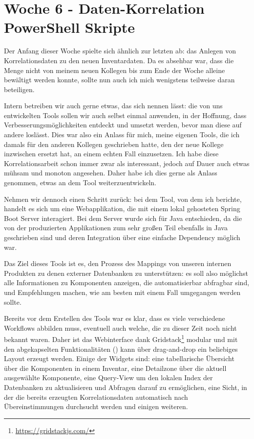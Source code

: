 \section{Woche 6 - Daten-Korrelation \headerand PowerShell Skripte} \label{sec:bericht-wo-6}



Der Anfang dieser Woche spielte sich ähnlich zur letzten ab: das Anlegen von Korrelationsdaten zu den neuen Inventardaten.
Da es absehbar war, dass die Menge nicht von meinem neuen Kollegen bis zum Ende der Woche alleine bewältigt werden konnte, sollte nun auch ich mich wenigstens teilweise daran beteiligen.

Intern betreiben wir auch gerne etwas, das sich  nennen lässt:
die von uns entwickelten Tools sollen wir auch selbst einmal anwenden, in der Hoffnung, dass Verbesserungsmöglichkeiten entdeckt und umsetzt werden, bevor man diese auf andere loslässt.
Dies war also ein Anlass für mich, meine eigenen Tools, die ich damals für den anderen Kollegen geschrieben hatte, den der neue Kollege inzwischen ersetzt hat, an einem echten Fall einzusetzen.
Ich habe diese Korrelationsarbeit schon immer zwar als interessant, jedoch auf Dauer auch etwas mühsam und monoton angesehen.
Daher habe ich dies gerne als Anlass genommen, etwas an dem Tool weiterzuentwickeln.

Nehmen wir dennoch einen Schritt zurück:
bei dem Tool, von dem ich berichte, handelt es sich um eine Webapplikation, die mit einem lokal gehosteten Spring Boot Server interagiert.
Bei dem Server wurde sich für Java entschieden, da die von der {\metaeffekt} produzierten Applikationen zum sehr großen Teil ebenfalls in Java geschrieben sind und deren Integration über eine einfache Dependency möglich war.

Das Ziel dieses Tools ist es, den Prozess des Mappings von unseren internen Produkten zu denen externer Datenbanken zu unterstützen:
es soll also möglichst alle Informationen zu Komponenten anzeigen, die automatisierbar abfragbar sind, und Empfehlungen machen, wie am besten mit einem Fall umgegangen werden sollte.

Bereits vor dem Erstellen des Tools war es klar, dass es viele verschiedene Workflows abbilden muss, eventuell auch welche, die zu dieser Zeit noch nicht bekannt waren.
Daher ist das Webinterface dank Gridstack\footnote{\url{https://gridstackjs.com/}} modular und mit den abgekapselten Funktionalitäten () kann über drag-and-drop ein beliebiges Layout erzeugt werden.
Einige der Widgets sind:
eine tabellarische Übersicht über die Komponenten in einem Inventar, eine Detailzone über die aktuell ausgewählte Komponente,
eine Query-View um den lokalen Index der Datenbanken zu aktualisieren und Abfragen darauf zu ermöglichen, eine Sicht,
in der die bereits erzeugten Korrelationsdaten automatisch nach Übereinstimmungen durchsucht werden und einigen weiteren.

